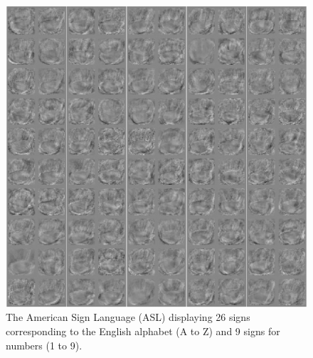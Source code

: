 \documentclass[a4paper]{article}
\begin{document}
\begin{figure}
\centering
\includegraphics[width=12.2cm]{img/weightsS05.eps}
\caption{The American Sign Language (ASL) displaying 26 signs corresponding to the
English alphabet (A to Z) and 9 signs for numbers (1 to 9).}
\label{fig:asl}
\end{figure}


 

\end{document}
